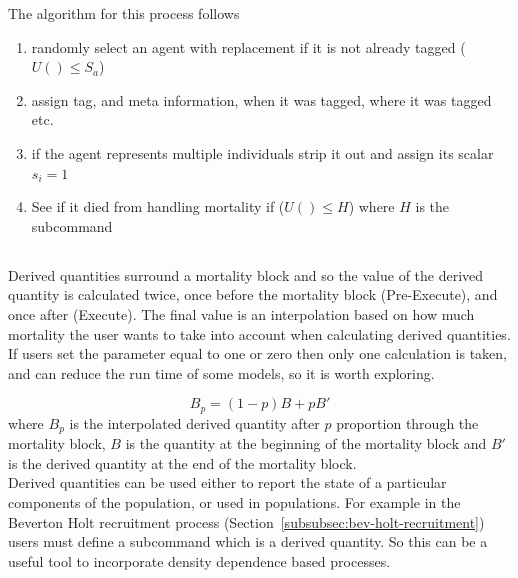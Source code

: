 The algorithm for this process follows
\begin{enumerate}
	\item randomly select an agent with replacement if it is not already tagged ($U() \leq S_a$)
	\item assign tag, and meta information, when it was tagged, where it was tagged etc.
	\item if the agent represents multiple individuals strip it out and assign its scalar $s_i = 1$
	\item See if it died from handling mortality if ($U() \leq H$) where $H$ is the subcommand 
\end{enumerate}

\subsection{\label{sec:derived-quantities}}
Derived quantities surround a mortality block and so the value of the derived quantity is calculated twice, once before the mortality block (Pre-Execute), and once after (Execute). The final value is an interpolation based on how much mortality the user wants to take into account when calculating derived quantities. If users set the  parameter equal to one or zero then only one calculation is taken, and can reduce the run time of some models, so it is worth exploring.

\begin{equation}
	B_p = (1 - p)B + pB'
\end{equation}
where $B_p$ is the interpolated derived quantity after $p$ proportion through the mortality block, $B$ is the quantity at the beginning of the mortality block and $B'$ is the derived quantity at the end of the mortality block.\\

Derived quantities can be used either to report the state of a particular components of the population, or used in populations. For example in the Beverton Holt recruitment process (Section~\ref{subsubsec:bev-holt-recruitment}) users must define a subcommand  which is a derived quantity. So this can be a useful tool to incorporate density dependence based processes.

